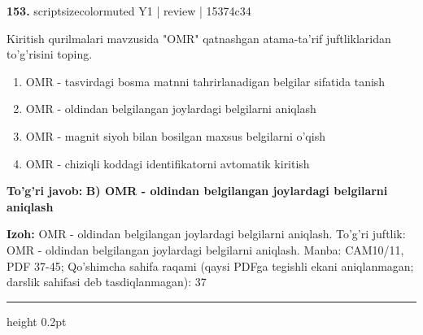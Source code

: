 \documentclass[10pt,a4paper]{article}
\begin{document}
{\bfseries\sffamily\color{ink} 153.} {scriptsizecolor{muted} Y1 | review | 15374c34}
\par
Kiritish qurilmalari mavzusida "OMR" qatnashgan atama-ta'rif juftliklaridan to'g'risini toping.
\begin{enumerate}[label=\Alph*),leftmargin=9mm]
\item OMR - tasvirdagi bosma matnni tahrirlanadigan belgilar sifatida tanish
\item OMR - oldindan belgilangan joylardagi belgilarni aniqlash
\item OMR - magnit siyoh bilan bosilgan maxsus belgilarni o'qish
\item OMR - chiziqli koddagi identifikatorni avtomatik kiritish
\end{enumerate}
\begin{tcolorbox}[enhanced,breakable,colback=teal!4,colframe=teal!60!black,boxrule=0.45pt,arc=1.2mm,left=2.7mm,right=2.7mm,top=1.8mm,bottom=1.8mm,before skip=2mm,after skip=2mm]
{\bfseries\sffamily\color{teal}To'g'ri javob:} \textbf{B) OMR - oldindan belgilangan joylardagi belgilarni aniqlash}
\par\smallskip
{\bfseries Izoh:} OMR - oldindan belgilangan joylardagi belgilarni aniqlash. To'g'ri juftlik: OMR - oldindan belgilangan joylardagi belgilarni aniqlash. Manba: CAM10/11, PDF 37-45; Qo'shimcha sahifa raqami (qaysi PDFga tegishli ekani aniqlanmagan; darslik sahifasi deb tasdiqlanmagan): 37
\end{tcolorbox}
\vspace{2mm}\hrule height 0.2pt\vspace{3mm}
\end{document}
